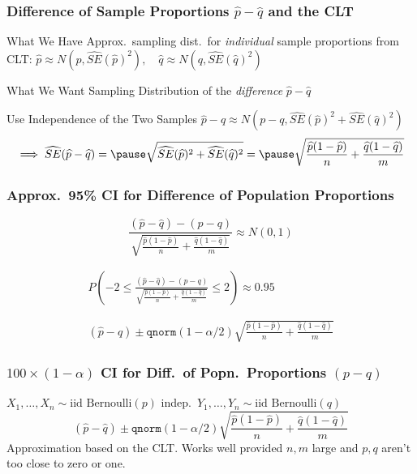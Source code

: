 \documentclass[handout]{beamer}
\begin{document}
\begin{frame}
\frametitle{Difference of Sample Proportions $\widehat{p}-\widehat{q}$ and the CLT}
\begin{block}{What We Have}
Approx.\ sampling dist.\ for \emph{individual} sample proportions from CLT:
\alert{$\widehat{p} \approx N\left(p, \widehat{SE}(\widehat{p})^2\right), \quad \widehat{q} \approx N\left(q, \widehat{SE}(\widehat{q})^2\right)$}
\end{block}\pause

\begin{block}{What We Want}
Sampling Distribution of the \emph{difference} $\widehat{p} - \widehat{q}$
\end{block}\pause

\begin{block}{Use Independence of the Two Samples}
\alert{$\widehat{p} - \widehat{q} \approx N\left( p - q, \widehat{SE}(\widehat{p})^2 +\widehat{SE}(\widehat{q})^2\right)$} \pause
$$\implies \widehat{SE}(\widehat{p} - \widehat{q}) = \pause \sqrt{\widehat{SE}(\widehat{p})^2 +\widehat{SE}(\widehat{q})^2}  = \pause  \sqrt{\frac{\widehat{p}(1-\widehat{p})}{n} + \frac{\widehat{q}(1-\widehat{q})}{m}}$$
\end{block}

\end{frame}
\begin{frame}
\frametitle{Approx.\ 95\% CI for Difference of Population Proportions}


$$\frac{(\widehat{p} - \widehat{q}) - (p - q)}{\sqrt{\frac{\widehat{p}(1-\widehat{p})}{n} + \frac{\widehat{q}(1-\widehat{q})}{m}}} \approx N(0,1)$$
 

 

\begin{eqnarray*}
	P\left( -2 \leq  \frac{(\widehat{p} - \widehat{q}) - (p - q)}{\sqrt{\frac{\widehat{p}(1-\widehat{p})}{n} + \frac{\widehat{q}(1-\widehat{q})}{m}}}\leq 2\right) \approx 0.95 \\ \\ \\ 
	(\widehat{p} - \widehat{q}) \pm \texttt{qnorm}(1-\alpha/2) \sqrt{\frac{\widehat{p}(1-\widehat{p})}{n} + \frac{\widehat{q}(1-\widehat{q})}{m}}
\end{eqnarray*}

\end{frame}
\begin{frame}
\frametitle{$100\times(1-\alpha)$ CI for Diff.\ of Popn.\ Proportions $(p-q)$}
$X_1, \hdots, X_n \sim \mbox{iid Bernoulli}(p)$ indep.\ $Y_1, \hdots, Y_n \sim \mbox{iid Bernoulli}(q)$
	$$(\widehat{p} - \widehat{q}) \pm \texttt{qnorm}(1-\alpha/2) \sqrt{\frac{\widehat{p}(1-\widehat{p})}{n} + \frac{\widehat{q}(1-\widehat{q})}{m}}$$
	\alert{Approximation based on the CLT. Works well provided $n,m$ large and $p,q$ aren't too close to zero or one.}
\end{frame}
\end{document}
